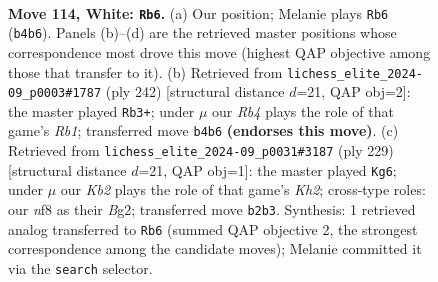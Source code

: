 \documentclass[11pt]{article}
\begin{document}
\clearpage

\begin{figure}[p]\centering
\begin{subfigure}{0.46\textwidth}\centering
\resizebox{\linewidth}{!}{%
\newchessgame
\chessboard[
  setfen={5n2/8/7p/r3p3/1R5b/3p3k/1K6/8 w - - 24 114},
  showmover=false,
  pgfstyle=straightmove, color=movearrow, markmove={b4-b6}
]}
\caption{}
\end{subfigure}\hfill
\begin{subfigure}{0.46\textwidth}\centering
\resizebox{\linewidth}{!}{%
\newchessgame
\chessboard[
  setfen={8/8/8/5p2/8/6k1/3r1p2/1R3K2 w - - 4 122},
  showmover=false,
  pgfstyle=straightmove, color=movearrow, markmove={b1-b3}
]}
\caption{}
\end{subfigure}
\\[4pt]
\begin{subfigure}{0.46\textwidth}\centering
\resizebox{\linewidth}{!}{%
\newchessgame
\chessboard[
  setfen={5R2/7k/4r3/K1P4p/7B/6P1/6b1/8 b - - 46 115},
  showmover=false,
  pgfstyle=straightmove, color=movearrow, markmove={h7-g6}
]}
\caption{}
\end{subfigure}\hfill

\caption{\textbf{Move 114, White: \texttt{Rb6}.} (a) Our position; Melanie plays \texttt{Rb6} (\texttt{b4b6}). Panels (b)--(d) are the retrieved master positions whose correspondence most drove this move (highest QAP objective among those that transfer to it). (b) Retrieved from \texttt{lichess\_elite\_2024-09\_p0003\#1787} (ply 242) [structural distance $d$=21, QAP obj=2]: the master played \texttt{Rb3+}; under $\mu$ our \emph{Rb4} plays the role of that game's \emph{Rb1}; transferred move \texttt{b4b6} \textbf{(endorses this move)}. (c) Retrieved from \texttt{lichess\_elite\_2024-09\_p0031\#3187} (ply 229) [structural distance $d$=21, QAP obj=1]: the master played \texttt{Kg6}; under $\mu$ our \emph{Kb2} plays the role of that game's \emph{Kh2}; cross-type roles: our \emph{n}f8 as their \emph{B}g2; transferred move \texttt{b2b3}. Synthesis: 1 retrieved analog transferred to \texttt{Rb6} (summed QAP objective 2, the strongest correspondence among the candidate moves); Melanie committed it via the \texttt{search} selector.}
\label{fig:thought-m226}
\end{figure}

\clearpage
\end{document}
